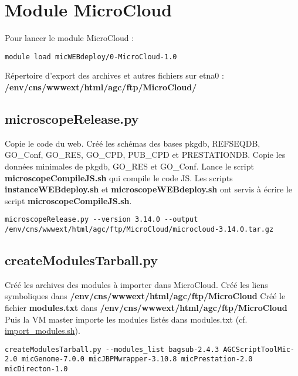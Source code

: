 \section {Module MicroCloud}

Pour lancer le module MicroCloud :
\begin{lstlisting}[style=bash]
module load micWEBdeploy/0-MicroCloud-1.0
\end{lstlisting}

Répertoire d'export des archives et autres fichiers sur etna0 :
\textbf{/env/cns/wwwext/html/agc/ftp/MicroCloud/}

\subsection{microscopeRelease.py}
Copie le code du web.
\newline
Créé les schémas des bases pkgdb, REFSEQDB, GO\_Conf, GO\_RES, GO\_CPD, PUB\_CPD et PRESTATIONDB.
\newline
Copie les données minimales de pkgdb, GO\_RES et GO\_Conf.
\newline
Lance le script \textbf{microscopeCompileJS.sh} qui compile le code JS. Les scripts \textbf{instanceWEBdeploy.sh} et \textbf{microscopeWEBdeploy.sh} ont servis à écrire le script \textbf{microscopeCompileJS.sh}.

\begin{lstlisting}[style=bash]
microscopeRelease.py --version 3.14.0 --output /env/cns/wwwext/html/agc/ftp/MicroCloud/microcloud-3.14.0.tar.gz
\end{lstlisting}

\subsection{createModulesTarball.py}
Créé les archives des modules à importer dans MicroCloud.
\newline
Créé les liens symboliques dans \textbf{/env/cns/wwwext/html/agc/ftp/MicroCloud}
\newline
Créé le fichier \textbf{modules.txt} dans \textbf{/env/cns/wwwext/html/agc/ftp/MicroCloud}
\newline
Puis la VM master importe les modules listés dans modules.txt (cf. \href{https://github.com/IFB-ElixirFr/biosphere-microcloud/blob/master/master/import_modules.sh}{import\_modules.sh}).

\begin{lstlisting}[style=bash]
createModulesTarball.py --modules_list bagsub-2.4.3 AGCScriptToolMic-2.0 micGenome-7.0.0 micJBPMwrapper-3.10.8 micPrestation-2.0 micDirecton-1.0
\end{lstlisting}

